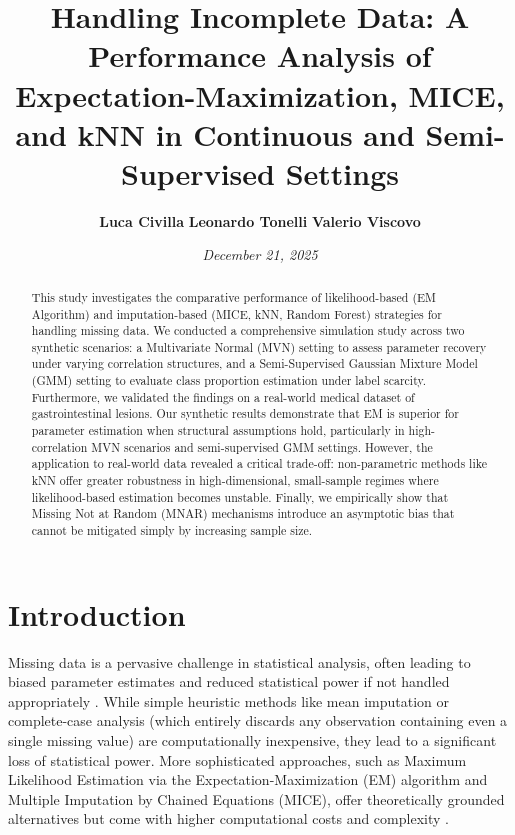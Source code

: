 \documentclass[11pt, a4paper]{article}
\title{\textbf{\Large Handling Incomplete Data: A Performance Analysis of Expectation-Maximization, MICE, and kNN in Continuous and Semi-Supervised Settings}}
\author{\textbf{Luca Civilla} \quad \textbf{Leonardo Tonelli} \quad \textbf{Valerio Viscovo}}
\date{\vspace{-1ex}\textit{December 21, 2025}}
\begin{document}
\maketitle
\thispagestyle{plain} %

\begin{abstract}
    \noindent This study investigates the comparative performance of likelihood-based (EM Algorithm) and imputation-based (MICE, kNN, Random Forest) strategies for handling missing data. We conducted a comprehensive simulation study across two synthetic scenarios: a Multivariate Normal (MVN) setting to assess parameter recovery under varying correlation structures, and a Semi-Supervised Gaussian Mixture Model (GMM) setting to evaluate class proportion estimation under label scarcity. Furthermore, we validated the findings on a real-world medical dataset of gastrointestinal lesions. Our synthetic results demonstrate that EM is superior for parameter estimation when structural assumptions hold, particularly in high-correlation MVN scenarios and semi-supervised GMM settings. However, the application to real-world data revealed a critical trade-off: non-parametric methods like kNN offer greater robustness in high-dimensional, small-sample regimes where likelihood-based estimation becomes unstable. Finally, we empirically show that Missing Not at Random (MNAR) mechanisms introduce an asymptotic bias that cannot be mitigated simply by increasing sample size.
\end{abstract}

\vspace{1em}


{
  \hypersetup{linkcolor=black} %
  \tableofcontents
}



\section{Introduction} 

Missing data is a pervasive challenge in statistical analysis, often leading to biased parameter estimates and reduced statistical power if not handled appropriately \citep{LittleRubin2019}.
While simple heuristic methods like mean imputation or complete-case analysis (which entirely discards any observation containing even a single missing value) are computationally inexpensive, they lead to a significant loss of statistical power.
More sophisticated approaches, such as Maximum Likelihood Estimation via the Expectation-Maximization (EM) algorithm and Multiple Imputation by Chained Equations (MICE), offer theoretically grounded alternatives but come with higher computational costs and complexity \citep{VanBuuren2011}.
\end{document}
